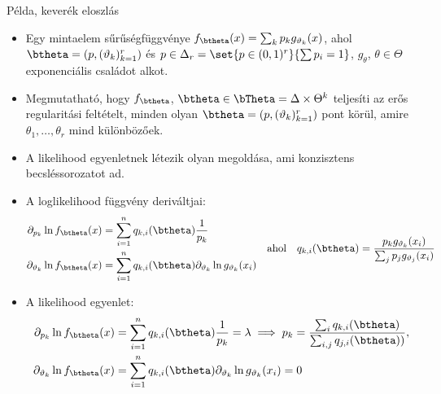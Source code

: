 \documentclass[aspectratio=169,notheorems,9pt,\option]{beamer}
\begin{document}
\begin{frame}{Példa, keverék eloszlás}
  \begin{itemize}
    \item Egy mintaelem sűrűségfüggvénye $f_{\btheta}(x)=\sum_k p_k g_{\theta_k}(x)$, ahol 
    $\btheta=(p,(\theta_k)_{k=1}^r)$ és $p\in\Delta_r=\set{p\in (0,1)^r}{\sum p_i=1}$, 
    $g_{\theta}$, $\theta\in\Theta$ exponenciális családot alkot. 
    \item Megmutatható, hogy $f_\btheta$, $\btheta\in\bTheta=\Delta\times\Theta^k$ 
    teljesíti az erős regularitási feltételt, minden olyan $\btheta=(p,(\theta_k)_{k=1}^r)$ pont körül, amire 
    $\theta_1,\dots,\theta_r$ mind különbözőek.
    \item A likelihood egyenletnek létezik olyan megoldása, ami konzisztens becsléssorozatot ad.
    \item A loglikelihood függvény deriváltjai:
    \begin{displaymath}  
    \begin{aligned}
      \partial_{p_k} \ln f_{\btheta}(x) 
      & =\sum_{i=1}^n q_{k,i}(\btheta) \frac1{p_k}\\
      \partial_{\theta_k} \ln f_{\btheta}(x) 
      & =\sum_{i=1}^n q_{k,i}(\btheta) \partial_{\theta_k} \ln g_{\theta_k}(x_i)
    \end{aligned}
    \quad\text{ahol}\quad
    q_{k,i}(\btheta) = \frac{p_k g_{\theta_k}(x_i)}{\sum_j p_j g_{\theta_j}(x_i)}
    \end{displaymath}
    \item A likelihood egyenlet:
    \begin{align*}
      \partial_{p_k} \ln f_{\btheta}(x) & =\sum_{i=1}^n q_{k,i}(\btheta) \frac1{p_k}=\lambda 
      \implies p_k = \frac{\sum_{i} q_{k,i}(\btheta)}{\sum_{i,j} q_{j,i}(\btheta))} ,
      \\
      \partial_{\theta_k} \ln f_{\btheta}(x) & =\sum_{i=1}^n q_{k,i}(\btheta) \partial_{\theta_k} \ln g_{\theta_k}(x_i)=0
    \end{align*}
  \end{itemize}
\end{frame}
\end{document}
